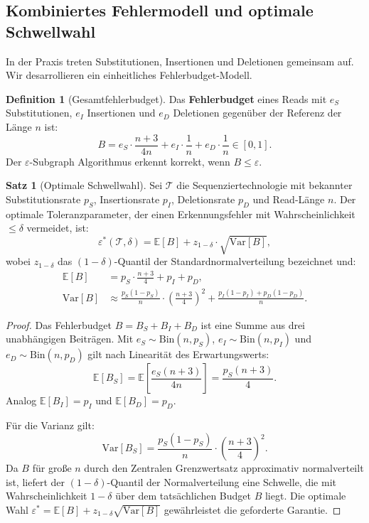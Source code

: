 ﻿\documentclass[a4paper,12pt]{article}
\theoremstyle{definition}
\newtheorem{definition}{Definition}
\newtheorem{satz}{Satz}
\begin{document}
\subsection{Kombiniertes Fehlermodell und optimale Schwellwahl}

In der Praxis treten Substitutionen, Insertionen und Deletionen gemeinsam auf.
Wir desarrollieren ein einheitliches Fehlerbudget-Modell.

\begin{definition}[Gesamtfehlerbudget]
    \label{def:fehlerbudget}
    Das \textbf{Fehlerbudget} eines Reads mit $e_S$ Substitutionen,
    $e_I$ Insertionen und $e_D$ Deletionen gegen\"{u}ber der Referenz
    der L\"{a}nge $n$ ist:
    \[
        B = e_S \cdot \frac{n+3}{4n} + e_I \cdot \frac{1}{n}
          + e_D \cdot \frac{1}{n} \in [0, 1].
    \]
    Der $\varepsilon$-Subgraph Algorithmus erkennt korrekt, wenn
    $B \leq \varepsilon$.
\end{definition}

\begin{satz}[Optimale Schwellwahl]
    \label{satz:optimale_schwelle}
    Sei $\mathcal{T}$ die Sequenziertechnologie mit bekannter
    Substitutionsrate $p_S$, Insertionsrate $p_I$, Deletionsrate $p_D$
    und Read-L\"{a}nge $n$. Der optimale Toleranzparameter, der einen
    Erkennungsfehler mit Wahrscheinlichkeit $\leq \delta$ vermeidet, ist:
    \[
        \varepsilon^*(\mathcal{T}, \delta) =
        \mathbb{E}[B] + z_{1-\delta} \cdot \sqrt{\mathrm{Var}[B]},
    \]
    wobei $z_{1-\delta}$ das $(1-\delta)$-Quantil der Standardnormalverteilung
    bezeichnet und:
    \begin{align*}
        \mathbb{E}[B] &= p_S \cdot \frac{n+3}{4}
                        + p_I + p_D, \\
        \mathrm{Var}[B] &\approx \frac{p_S(1-p_S)}{n} \cdot \left(\frac{n+3}{4}\right)^2
                          + \frac{p_I(1-p_I) + p_D(1-p_D)}{n}.
    \end{align*}
\end{satz}

\begin{proof}
    Das Fehlerbudget $B = B_S + B_I + B_D$ ist eine Summe aus drei
    unabh\"{a}ngigen Beitr\"{a}gen. Mit $e_S \sim \mathrm{Bin}(n, p_S)$,
    $e_I \sim \mathrm{Bin}(n, p_I)$ und $e_D \sim \mathrm{Bin}(n, p_D)$
    gilt nach Linearit\"{a}t des Erwartungswerts:
    \[
        \mathbb{E}[B_S] = \mathbb{E}\!\left[\frac{e_S(n+3)}{4n}\right]
        = \frac{p_S(n+3)}{4}.
    \]
    Analog $\mathbb{E}[B_I] = p_I$ und $\mathbb{E}[B_D] = p_D$.

    F\"{u}r die Varianz gilt:
    \[
        \mathrm{Var}[B_S] = \frac{p_S(1-p_S)}{n} \cdot \left(\frac{n+3}{4}\right)^2.
    \]
    Da $B$ f\"{u}r gro{\ss}e $n$ durch den Zentralen Grenzwertsatz
    approximativ normalverteilt ist, liefert der $(1-\delta)$-Quantil
    der Normalverteilung eine Schwelle, die mit Wahrscheinlichkeit $1-\delta$
    \"{u}ber dem tats\"{a}chlichen Budget $B$ liegt. Die optimale Wahl
    $\varepsilon^* = \mathbb{E}[B] + z_{1-\delta} \sqrt{\mathrm{Var}[B]}$
    gew\"{a}hrleistet die geforderte Garantie. 
\end{proof}
\end{document}
